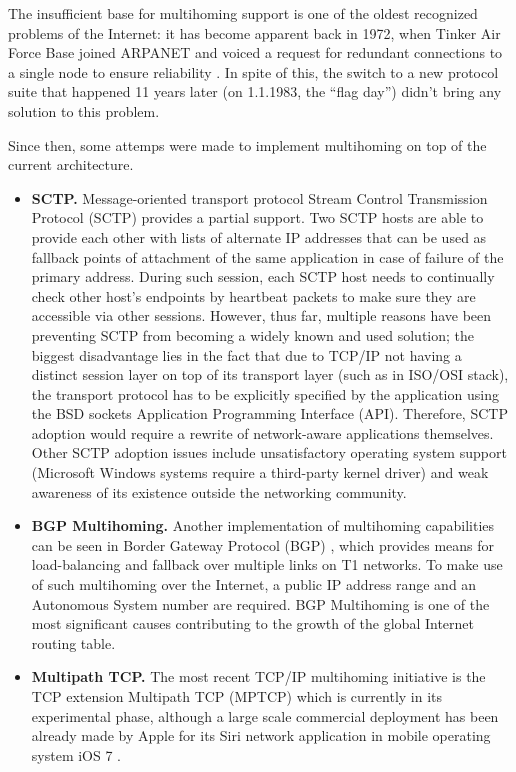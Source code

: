         The insufficient base for multihoming support is one of the oldest recognized problems of the Internet: it has become apparent back in 1972, when Tinker Air Force Base joined ARPANET and voiced a request for redundant connections to a single node to ensure reliability \cite{Patterns}. In spite of this, the switch to a new protocol suite that happened 11 years later (on 1.1.1983, the ``flag day'') didn't bring any solution to this problem.

        Since then, some attemps were made to implement multihoming on top of the current architecture.

        \begin{itemize}
            \item \textbf{SCTP.}
            Message-oriented transport protocol Stream Control Transmission Protocol (SCTP) \cite{rfc4960} provides a partial support. Two SCTP hosts are able to provide each other with lists of alternate IP addresses that can be used as fallback points of attachment of the same application in case of failure of the primary address. During such session, each SCTP host needs to continually check other host's endpoints by heartbeat packets to make sure they are accessible via other sessions.
            However, thus far, multiple reasons have been preventing SCTP from becoming a widely known and used solution; the biggest disadvantage lies in the fact that due to TCP/IP not having a distinct session layer on top of its transport layer (such as in ISO/OSI stack), the transport protocol has to be explicitly specified by the application using the BSD sockets Application Programming Interface (API). Therefore, SCTP adoption would require a rewrite of network-aware applications themselves. Other SCTP adoption issues include unsatisfactory operating system support (Microsoft Windows systems require a third-party kernel driver) and weak awareness of its existence outside the networking community.

            \item \textbf{BGP Multihoming.} Another implementation of multihoming capabilities can be seen in Border Gateway Protocol (BGP) \cite{rfc4271}, which provides means for load-balancing and fallback over multiple links on T1 networks. To make use of such multihoming over the Internet, a public IP address range and an Autonomous System number are required. BGP Multihoming is one of the most significant causes contributing to the growth of the global Internet routing table.

            \item \textbf{Multipath TCP.} The most recent TCP/IP multihoming initiative is the TCP extension Multipath TCP (MPTCP) which is currently in its experimental phase, although a large scale commercial deployment has been already made by Apple for its Siri network application in mobile operating system iOS 7 \cite{Apple_MP}.
        \end{itemize}

